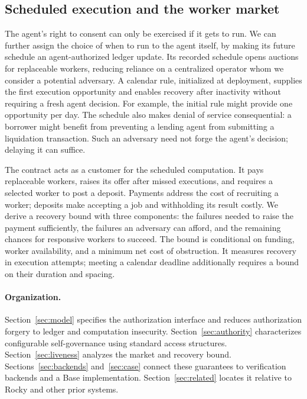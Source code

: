\documentclass[10pt,letterpaper]{article}
\begin{document}
\subsection{Scheduled execution and the worker market}
The agent's right to consent can only be exercised if it gets to run. We can further assign the choice of when to run to the agent itself, by making its future schedule an agent-authorized ledger update. Its recorded schedule opens auctions for replaceable workers, reducing reliance on a centralized operator whom we consider a potential adversary. A calendar rule, initialized at deployment, supplies the first execution opportunity and enables recovery after inactivity without requiring a fresh agent decision. For example, the initial rule might provide one opportunity per day. The schedule also makes denial of service consequential: a borrower might benefit from preventing a lending agent from submitting a liquidation transaction. Such an adversary need not forge the agent's decision; delaying it can suffice.

The contract acts as a customer for the scheduled computation. It pays replaceable workers, raises its offer after missed executions, and requires a selected worker to post a deposit. Payments address the cost of recruiting a worker; deposits make accepting a job and withholding its result costly. We derive a recovery bound with three components: the failures needed to raise the payment sufficiently, the failures an adversary can afford, and the remaining chances for responsive workers to succeed. The bound is conditional on funding, worker availability, and a minimum net cost of obstruction. It measures recovery in execution attempts; meeting a calendar deadline additionally requires a bound on their duration and spacing.

\paragraph{Organization.}
Section~\ref{sec:model} specifies the authorization interface and reduces authorization forgery to ledger and computation insecurity. Section~\ref{sec:authority} characterizes configurable self-governance using standard access structures. Section~\ref{sec:liveness} analyzes the market and recovery bound. Sections~\ref{sec:backends} and~\ref{sec:case} connect these guarantees to verification backends and a Base implementation. Section~\ref{sec:related} locates it relative to Rocky and other prior systems.
\end{document}
